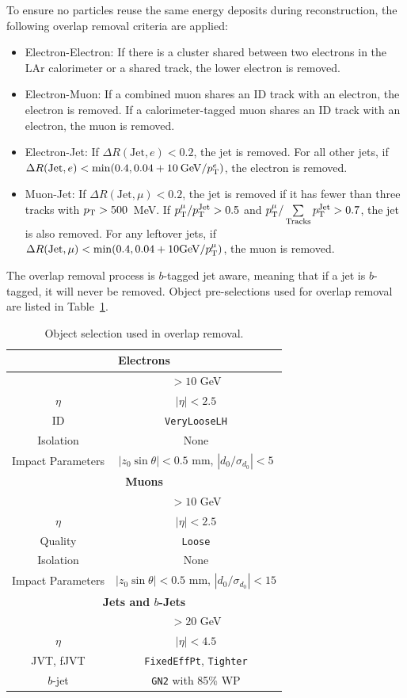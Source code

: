 To ensure no particles reuse the same energy deposits during reconstruction, the following overlap removal criteria are applied:
\begin{itemize}
  \item Electron-Electron: If there is a cluster shared between two electrons in the LAr calorimeter or a shared track, the lower \pt{} electron is removed.
  \item Electron-Muon: If a combined muon shares an ID track with an electron, the electron is removed. If a calorimeter-tagged muon shares an ID track with an electron, the muon is removed.
  \item Electron-Jet: If $\Delta{R}(\mathrm{Jet}, e) < 0.2$, the jet is removed. For all other jets, if $\Delta{R}(\mathrm{Jet}, e) < \min(0.4, 0.04 + 10\:\mathrm{GeV}/p_{\mathrm{T}}^{e})$, the electron is removed.
  \item Muon-Jet: If $\Delta{R}(\mathrm{Jet}, \mu) < 0.2$, the jet is removed if it has fewer than three tracks with $p_{\mathrm{T}} > 500$~MeV. If $p_{\mathrm{T}}^{\mu}/p_{\mathrm{T}}^{\mathrm{Jet}} > 0.5$ and $p_{\mathrm{T}}^{\mu}/\sum\limits_{\mathrm{Tracks}}p_{\mathrm{T}}^{\mathrm{Jet}} > 0.7$, the jet is also removed. For any leftover jets, if $\Delta{R}(\mathrm{Jet}, \mu) < \min(0.4, 0.04 + 10\mathrm{GeV}/p_{\mathrm{T}}^{\mu})$, the muon is removed.
\end{itemize}

The overlap removal process is $b$-tagged jet aware, meaning that if a jet is $b$-tagged, it will never be removed. Object pre-selections used for overlap removal are listed in Table~\ref{tab:vh_objects_overlap_removal}.

\begin{table}[ht]
\centering
\begin{tabular}{c|c}
  \hline
  \multicolumn{2}{c}{\textbf{Electrons}} \\ 
  \hline
  \pt{} & $> 10$ GeV \\ 
  $\eta$ & $|\eta| < 2.5$ \\ 
  ID & \texttt{VeryLooseLH} \\
  Isolation & None \\
  Impact Parameters & $|z_{0}\sin{\theta}| < 0.5$ mm, $|d_{0}/\sigma_{d_{0}}| < 5$ \\
  \hline
  \multicolumn{2}{c}{\textbf{Muons}} \\ 
  \hline
  \pt{} & $> 10$ GeV \\
  $\eta$ & $|\eta| < 2.5$ \\
  Quality & \texttt{Loose} \\
  Isolation & None \\
  Impact Parameters & $|z_{0}\sin{\theta}| < 0.5$ mm, $|d_{0}/\sigma_{d_{0}}| < 15$ \\
  \hline
  \multicolumn{2}{c}{\textbf{Jets and $b$-Jets}} \\
  \hline
  \pt{} & $> 20$ GeV \\
  $\eta$ & $|\eta| < 4.5$ \\
  JVT, fJVT & \texttt{FixedEffPt}, \texttt{Tighter} \\
  $b$-jet & \texttt{GN2} with 85\% WP \\
  \hline
\end{tabular}
\caption{Object selection used in overlap removal.}\label{tab:vh_objects_overlap_removal}
\end{table}